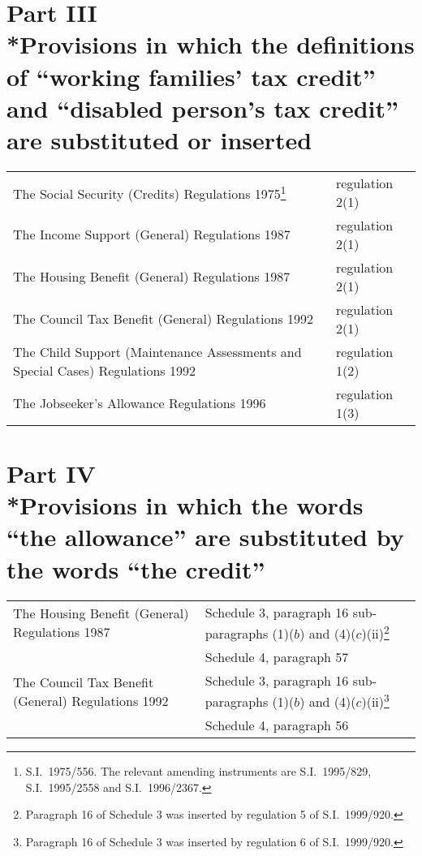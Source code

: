 \documentclass[12pt,a4paper]{article}
\begin{document}
\section[Part III --- Provisions in which the definitions of “working families' tax credit” and “disabled person's tax credit” are substituted or inserted]{\sloppy Part III\\*Provisions in which the definitions of “working families' tax credit” and “disabled person's tax credit” are substituted or inserted}

\renewcommand\parthead{--- Schedule 2 Part III}

\begin{longtable}{p{311.51366pt}p{54.49594pt}}
\hline
\endhead
\hline
\endlastfoot
The Social Security (Credits) Regulations 1975\footnote{S.I.\ 1975/556. The relevant amending instruments are S.I.\ 1995/829, S.I.\ 1995/2558 and S.I.\ 1996/2367.}&	regulation 2(1)\\
The Income Support (General) Regulations 1987	&regulation 2(1)\\
The Housing Benefit (General) Regulations 1987	&regulation 2(1)\\
The Council Tax Benefit (General) Regulations 1992	&regulation 2(1)\\
The Child Support (Maintenance Assessments and Special Cases) Regulations 1992	&regulation 1(2)\\
The Jobseeker’s Allowance Regulations 1996	&regulation 1(3)\\
\end{longtable}

\section[Part IV --- Provisions in which the words “the allowance” are substituted by the words “the credit”]{Part IV\\*Provisions in which the words “the allowance” are substituted by the words “the credit”}

\renewcommand\parthead{--- Schedule 2 Part IV}

\begin{longtable}{p{167.13934pt}p{198.86624pt}}
\hline
\endhead
\hline
\endlastfoot
The Housing Benefit (General) Regulations 1987	&Schedule 3, paragraph 16
	sub-paragraphs (1)($b$)  and (4)($c$)(ii)\footnote{Paragraph 16 of Schedule 3 was inserted by regulation 5 of S.I.\ 1999/920.}\\
	&Schedule 4, paragraph 57\\
The Council Tax Benefit (General) Regulations 1992	&Schedule 3, paragraph 16
	sub-paragraphs (1)($b$)  and (4)($c$)(ii)\footnote{Paragraph 16 of Schedule 3 was inserted by regulation 6 of S.I.\ 1999/920.}\\
&	Schedule 4, paragraph 56\\
\end{longtable}
\end{document}
